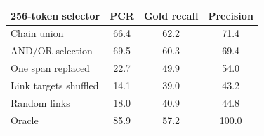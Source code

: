 \begin{tabular}{@{}lccc@{}}
\toprule
256-token selector & PCR & Gold recall & Precision \\
\midrule
Chain union & 66.4 & 62.2 & 71.4 \\
AND/OR selection & 69.5 & 60.3 & 69.4 \\
One span replaced & 22.7 & 49.9 & 54.0 \\
Link targets shuffled & 14.1 & 39.0 & 43.2 \\
Random links & 18.0 & 40.9 & 44.8 \\
Oracle & 85.9 & 57.2 & 100.0 \\
\bottomrule
\end{tabular}
